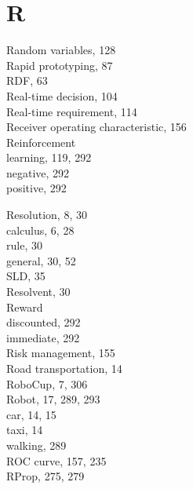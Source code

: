\documentclass[10pt]{book}
\begin{document}
\section*{R}
Random variables, 128\\
Rapid prototyping, 87\\
RDF, 63\\
Real-time decision, 104\\
Real-time requirement, 114\\
Receiver operating characteristic, 156\\
Reinforcement\\
learning, 119, 292\\
negative, 292\\
positive, 292

Resolution, 8, 30\\
calculus, 6, 28\\
rule, 30\\
general, 30, 52\\
SLD, 35\\
Resolvent, 30\\
Reward\\
discounted, 292\\
immediate, 292\\
Risk management, 155\\
Road transportation, 14\\
RoboCup, 7, 306\\
Robot, 17, 289, 293\\
car, 14, 15\\
taxi, 14\\
walking, 289\\
ROC curve, 157, 235\\
RProp, 275, 279
\end{document}
